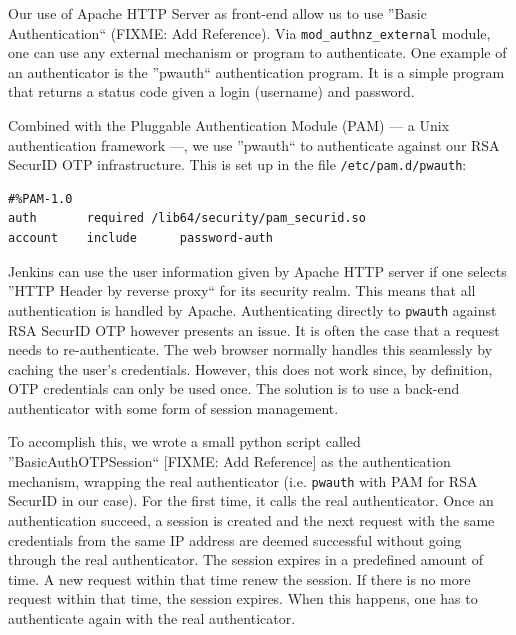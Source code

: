 \documentclass[10pt, conference, compsocconf]{IEEEtran}
\begin{document}
Our use of Apache HTTP Server as front-end allow us to use ''Basic Authentication`` (FIXME: Add Reference). Via \texttt{mod_authnz_external} module, one can use any external mechanism or program to authenticate. 
One example of an authenticator is the ''pwauth`` authentication program. 
It is a simple program that returns a status code given a login (username) and password. 

Combined with the Pluggable Authentication Module (PAM) --- a Unix authentication framework ---, we use ''pwauth`` to authenticate against our RSA SecurID OTP infrastructure. 
This is set up in the file \texttt{/etc/pam.d/pwauth}:
\begin{lstlisting}
#%PAM-1.0
auth	   required	/lib64/security/pam_securid.so
account    include      password-auth
\end{lstlisting}

Jenkins can use the user information given by Apache HTTP server if one selects ''HTTP Header by reverse proxy`` for its security realm. 
This means that all authentication is handled by Apache. 
Authenticating directly to \texttt{pwauth} against RSA SecurID OTP however presents an issue. 
It is often the case that a request needs to re-authenticate. 
The web browser normally handles this seamlessly by caching the user's credentials.
However, this does not work since, by definition, OTP credentials can only be used once. 
The solution is to use a back-end authenticator with some form of session management. 

To accomplish this, we wrote a small python script called ''BasicAuthOTPSession`` [FIXME: Add Reference] as the authentication mechanism, wrapping the real authenticator (i.e. \texttt{pwauth} with PAM for RSA SecurID in our case). 
For the first time, it calls the real authenticator. 
Once an authentication succeed, a session is created and the next request with the same credentials from the same IP address are deemed successful without going through the real authenticator. 
The session expires in a predefined amount of time. 
A new request within that time renew the session. 
If there is no more request within that time, the session expires.
When this happens, one has to authenticate again with the real authenticator. 
\end{document}
